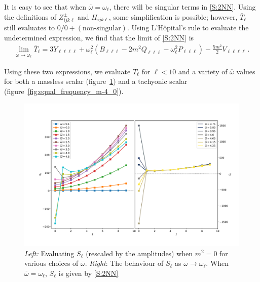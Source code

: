 \documentclass[letterpaper,11pt]{article}
\newcommand{\ol}{\omega_\ell}
\newcommand{\ob}{\overline{\omega}}
\begin{document}
It is easy to see that when $\ob = \ol$, there will be singular terms in \eqref{S:2NN}. Using the definitions of $Z^\pm_{ijk\ell}$ and $H_{ijk\ell}$, some simplification is possible; however, $\overline{T}_\ell$ still evaluates to $0/0 + (\text{non-singular})$. Using L'H\^{o}pital's rule to evaluate the undetermined expression, we find that the limit of \eqref{S:2NN} is
\begin{align}
\label{Tbar limit}
\lim_{\ob \to \ol} \overline{T}_\ell = 3Y_{\ell \ell \ell \ell} + \ol^2 \left( B_{\ell \ell \ell} - 2m^2 Q_{\ell \ell \ell} - \ol^2 P_{\ell \ell \ell} \right) - \frac{5m^2}{2} V_{\ell \ell \ell \ell} \, .
\end{align}

Using these two expressions, we evaluate $\overline{T}_\ell$ for $\ell < 10$ and a variety of $\ob$ values for both a massless scalar (figure~\ref{fig:equal_frequency_m0}) and a tachyonic scalar (figure~\ref{fig:equal_frequency_m-4_0}).

\begin{figure}
\centering
\includegraphics[width=\textwidth]{./figures/NN_equalfreq_sourceterms_m0_0+zoom}
\caption{{\it Left:} Evaluating $S_\ell$ (rescaled by the amplitudes) when $m^2 = 0$ for various choices of $\ob$. {\it Right}: The behaviour of $S_\ell$ as $\ob \to \ol$. When $\ob = \ol$, $S_\ell$ is given by \eqref{S:2NN}}
\label{fig:equal_frequency_m0}
\end{figure}
\end{document}
